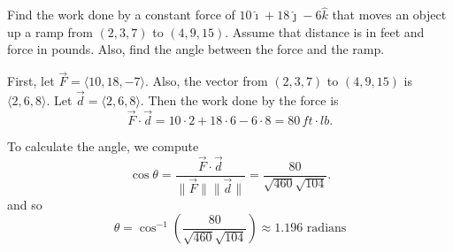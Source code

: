 \documentclass[]{ximera}
\begin{document}
\begin{instructorNotes}

\end{instructorNotes}







\begin{problem}
Find the work done by a constant force of $10 \hat{\imath} + 18 \hat{\jmath} - 6\hat{k}$ that moves an object up a ramp from $(2,3,7)$ to $(4,9,15)$.  
Assume that distance is in feet and force in pounds.  
Also, find the angle between the force and the ramp.
	\begin{freeResponse}
	First, let $\vec{F} = \langle 10,18,-7 \rangle$.  
	Also, the vector from $(2,3,7)$ to $(4,9,15)$ is $\langle 2,6,8 \rangle$.  
	Let $\vec{d} = \langle 2,6,8 \rangle$.  
	Then the work done by the force is
		\[
		\vec{F} \cdot \vec{d} = 10 \cdot 2 + 18 \cdot 6 - 6 \cdot 8 = \boxed{80 \, ft \cdot lb}.
		\]
		
	To calculate the angle, we compute
		\[
		\cos \theta = \frac{\vec{F} \cdot \vec{d}}{\| \vec{F} \| \| \vec{d} \|} = \frac{80}{\sqrt{460}\sqrt{104}}.
		\]
	and so
		\[
		\theta = \boxed{\cos^{-1} \left(  \frac{80}{\sqrt{460}\sqrt{104}} \right) \approx 1.196 \text{ radians}}
		\]
	\end{freeResponse}
		
\end{problem}

\begin{instructorNotes}

\end{instructorNotes}
\end{document}
